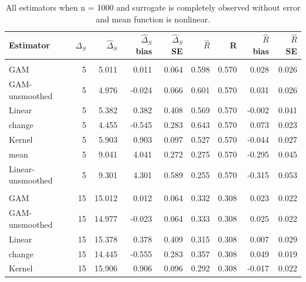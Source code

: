 \documentclass[useAMS,usenatbib,referee]{biom}
\begin{document}
\begin{table}[t]

\caption{\label{tab:oracle-large-n-nl}All estimators when n = 1000 and surrogate is completely observed without error and mean function is nonlinear.}
\centering
\begin{tabular}{lrrrrrrrr}
\toprule
Estimator & $\Delta_S$ & $\widehat{\Delta}_S$ & $\widehat{\Delta}_S$ bias & $\widehat{\Delta}_S$ SE & $\widehat{R}$ & R & $\widehat{R}$ bias & $\widehat{R}$ SE\\
\midrule
\addlinespace[0.3em]
\multicolumn{9}{l}{\textbf{Small residual effect}}\\
\hspace{1em}GAM & 5 & 5.011 & 0.011 & 0.064 & 0.598 & 0.570 & 0.028 & 0.026\\
\hspace{1em}GAM-unsmoothed & 5 & 4.976 & -0.024 & 0.066 & 0.601 & 0.570 & 0.031 & 0.026\\
\hspace{1em}Linear & 5 & 5.382 & 0.382 & 0.408 & 0.569 & 0.570 & -0.002 & 0.041\\
\hspace{1em}change & 5 & 4.455 & -0.545 & 0.283 & 0.643 & 0.570 & 0.073 & 0.023\\
\hspace{1em}Kernel & 5 & 5.903 & 0.903 & 0.097 & 0.527 & 0.570 & -0.044 & 0.027\\
\hspace{1em}mean & 5 & 9.041 & 4.041 & 0.272 & 0.275 & 0.570 & -0.295 & 0.045\\
\hspace{1em}Linear-unsmoothed & 5 & 9.301 & 4.301 & 0.589 & 0.255 & 0.570 & -0.315 & 0.053\\
\addlinespace[0.3em]
\multicolumn{9}{l}{\textbf{Medium residual effect}}\\
\hspace{1em}GAM & 15 & 15.012 & 0.012 & 0.064 & 0.332 & 0.308 & 0.023 & 0.022\\
\hspace{1em}GAM-unsmoothed & 15 & 14.977 & -0.023 & 0.064 & 0.333 & 0.308 & 0.025 & 0.022\\
\hspace{1em}Linear & 15 & 15.378 & 0.378 & 0.409 & 0.315 & 0.308 & 0.007 & 0.029\\
\hspace{1em}change & 15 & 14.445 & -0.555 & 0.283 & 0.357 & 0.308 & 0.049 & 0.019\\
\hspace{1em}Kernel & 15 & 15.906 & 0.906 & 0.096 & 0.292 & 0.308 & -0.017 & 0.022\\

\end{tabular}
\end{table}
\end{document}
